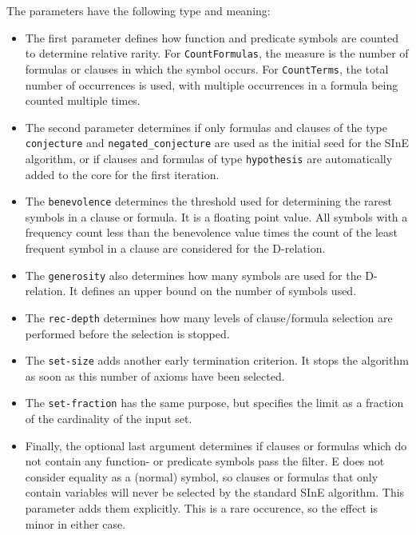 \documentclass{report}
\begin{document}
The parameters have the following type and meaning:
\begin{itemize}
\item The first parameter defines how function and predicate symbols
  are counted to determine relative rarity. For
  \texttt{CountFormulas}, the measure is the number of formulas or
  clauses in which the symbol occurs. For \texttt{CountTerms}, the
  total number of occurrences is used, with multiple occurrences in a
  formula being counted multiple times.
\item The second parameter determines if only formulas and clauses of
  the type \texttt{conjecture} and \texttt{negated\_conjecture} are
  used as the initial seed for the SInE algorithm, or if clauses and
  formulas of type \texttt{hypothesis} are automatically added to the
  core for the first iteration.
\item The \texttt{benevolence} determines the threshold used for
  determining the rarest symbols in a clause or formula. It is a
  floating point value. All symbols with a frequency count less than
  the benevolence value times the count of the least frequent symbol
  in a clause are considered for the D-relation.
\item The \texttt{generosity} also determines how many symbols are
  used for the D-relation. It defines an upper bound on the number of
  symbols used.
\item The \texttt{rec-depth} determines how many levels of
  clause/formula selection are performed before the selection is
  stopped.
\item The \texttt{set-size} adds another early termination
  criterion. It stops the algorithm as soon as this number of axioms
  have been selected.
\item The \texttt{set-fraction} has the same purpose, but specifies the limit
  as a fraction of the cardinality of the input set.
\item Finally, the optional last argument determines if clauses or
  formulas which do not contain any function- or predicate symbols
  pass the filter. E does not consider equality as a (normal) symbol,
  so clauses or formulas that only contain variables will never be
  selected by the standard SInE algorithm. This parameter adds them
  explicitly. This is a rare occurence, so the effect is minor in
  either case.
\end{itemize}
\end{document}
